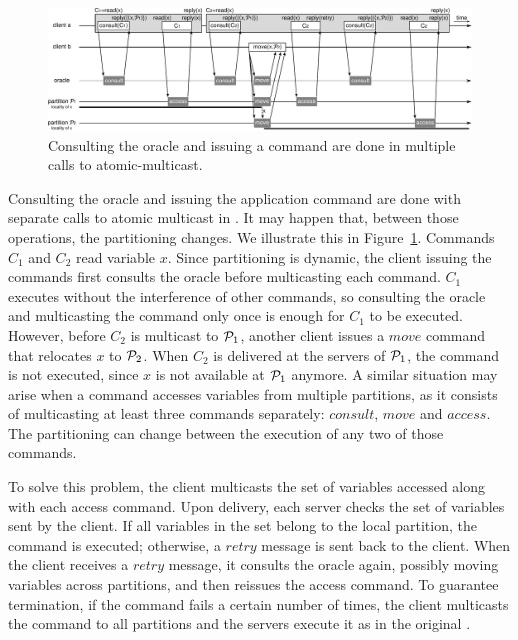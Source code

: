 \begin{figure}
\begin{minipage}[b]{1.0\linewidth}
\centering
      \includegraphics[width=0.8\linewidth]{figures/dssmr-detail}
\end{minipage}
\caption{Consulting the oracle and issuing a command are done in multiple calls to atomic-multicast.}
\label{fig:dssmr-detail}
\end{figure}

Consulting the oracle and issuing the application command are done with separate
calls to atomic multicast in \dssmr{}. It may happen that, between those
operations, the partitioning changes. We illustrate this in
Figure~\ref{fig:dssmr-detail}. Commands $C_1$ and $C_2$ read variable $x$. Since
partitioning is dynamic, the client issuing the commands first consults the
oracle before multicasting each command. $C_1$ executes without the interference
of other commands, so consulting the oracle and multicasting the command only
once is enough for $C_1$ to be executed. However, before $C_2$ is multicast to
$\mathcal{P}_1$, another client issues a $move$ command that relocates $x$ to $\mathcal{P}_2$.
When $C_2$ is delivered at the servers of $\mathcal{P}_1$, the command is not executed,
since $x$ is not available at $\mathcal{P}_1$ anymore. A similar situation may arise
when a command accesses variables from multiple partitions, as it consists of
multicasting at least three commands separately: $consult$, $move$ and $access$.
The partitioning can change between the execution of any two of those commands.

To solve this problem, the client multicasts the set of variables accessed along
with each access command. Upon delivery, each server checks the set of variables
sent by the client. If all variables in the set belong to the local partition,
the command is executed; otherwise, a $retry$ message is sent back to the
client. When the client receives a $retry$ message, it consults the oracle
again, possibly moving variables across partitions, and then reissues the access
command. To guarantee termination, if the command fails a certain number of
times, the client multicasts the command to all partitions and the servers
execute it as in the original \ssmr{}.

